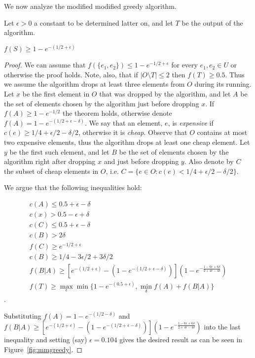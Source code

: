 We now analyze the modified modified greedy algorithm.

Let $\epsilon > 0$ a constant to be determined latter on, and let $T$ be the output of 
the algorithm.

\begin{theorem}
$f(S) \geq 1 - e^{-(1/2 + \epsilon)}$
\end{theorem}

\begin{proof}
We can assume that $f(\{e_1, e_2\}) \leq 1 - e^{-1/2 + \epsilon}$ 
for every $e_1, e_2 \in U$ or otherwise the proof holds.
Note, also, that if $|O \setminus T| \leq 2$ then $f(T) \geq 0.5$.
Thus we assume the algorithm drops at least three elements from $O$ during its running.
Let $x$ be the first element in $O$ that was dropped by the algorithm, 
and let $A$ be the set of elements chosen by the algorithm just before dropping $x$.
If $f(A) \geq 1 - e^{-1/2}$ the theorem holds, 
otherwise denote $f(A) = 1 - e^{-(1/2 + \epsilon - \delta)}$.
We say that an element, $e$, is \emph{expensive} if $c(e) \ge 1/4 + \epsilon/2 - \delta/2$, 
otherwise it is \emph{cheap}.
Observe that $O$ contains at most two expensive elements, thus the algorithm drops 
at least one cheap element. 
Let $y$ be the first such element, and let $B$ be the set of elements chosen by the 
algorithm right after dropping $x$ and just before dropping $y$.
Also denote by $C$ the subset of cheap elements in $O$, 
i.e. $C = \{e \in O : c(e) < 1/4 + \epsilon/2 - \delta/2\}$.

We argue that the following inequalities hold:

\begin{align}
c(A) \leq 0.5 + \epsilon - \delta 
\\
c(x) > 0.5 -\epsilon + \delta
\\
c(C) \leq 0.5 + \epsilon - \delta
\\
c(B) > 2\delta
\\
f(C) \ge e^{-1/2 + \epsilon}
\\
c(B) \ge 1/4 - 3\epsilon/2 + 3\delta/2
\\
f(B|A) \ge \left[
e^{-(1/2 + \epsilon)}
- (1 - e^{-(1/2 + \epsilon - \delta)})
\right]
(1-e^{-\frac{1-6\epsilon+6\delta}{2+4\epsilon-4\delta}})
\\
f(T) \geq \max_\epsilon \min \{1 - e^{-(0.5 + \epsilon)}, \min_{\delta} f(A) + f(B|A)\}
\end{align}
.

Substituting $f(A) = 1 - e^{-(1/2 - \delta)}$ 
and $f(B|A) \ge \left[
e^{-(1/2 + \epsilon)}
- (1 - e^{-(1/2 + \epsilon - \delta)})
\right]
(1-e^{-\frac{1-6\epsilon+6\delta}{2+4\epsilon-4\delta}})
$
into the last inequality and setting (say) $\epsilon = 0.104$ gives the desired result 
as can be seen in Figure~\ref{fig:mmgreedy}.

\end{proof}

